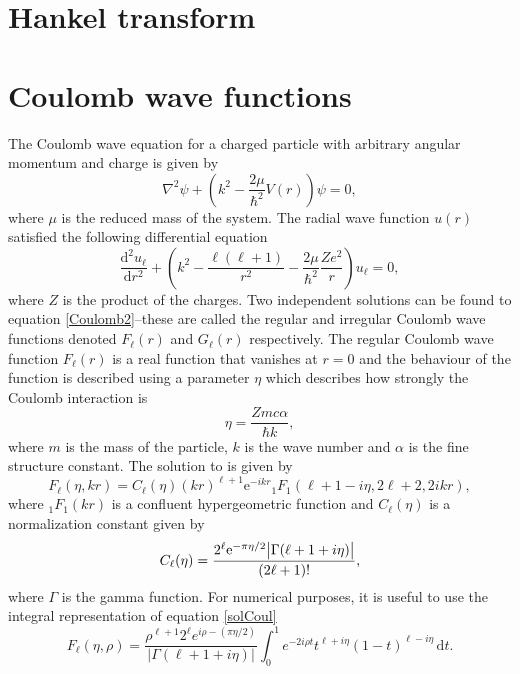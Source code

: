 \section{Hankel transform}
\section{Coulomb wave functions}\label{sec:Coulomb}
The Coulomb wave equation for a charged particle with arbitrary angular momentum and charge is given by 
\begin{equation} \label{Coulomb1}
	\nabla^2\psi +\left( k^2-\frac{2\mu}{\hbar^2}V(r)\right)\psi = 0,
\end{equation}
where $\mu$ is the reduced mass of the system. The radial wave function $u(r)$ satisfied the following differential equation
\begin{equation} \label{Coulomb2}
	\frac{\text{d}^2 u_\ell}{\text{d}r^2}+\left( k^2-\frac{\ell(\ell+1)}{r^2}-\frac{2\mu}{\hbar^2}\frac{Ze^2}{r}\right)u_\ell=0,
\end{equation}
where $Z$ is the product of the charges. Two independent solutions can be found to equation \eqref{Coulomb2}--these are called the regular and irregular Coulomb wave functions denoted $F_\ell(r)$ and $G_\ell(r)$ respectively. The regular Coulomb wave function $F_\ell(r)$ is a real function that vanishes at $r=0$ and the behaviour of the function is described using a parameter $\eta$ which describes how strongly the Coulomb interaction is
\begin{equation} \label{etafactor}
	\eta = \frac{Zmc\alpha }{\hbar k},
\end{equation}
where $m$ is the mass of the particle, $k$ is the wave number and $\alpha$ is the fine structure constant. The solution to is given by
\begin{equation} \label{solCoul}
	F_\ell(\eta,kr) = C_\ell (\eta) (kr)^{\ell+1}\text{e}^{-ikr}  {}_1 F_1(\ell+1-i\eta,2\ell+2,2ikr),
\end{equation}
where ${}_1F_1(kr)$ is a confluent hypergeometric function and $C_\ell(\eta)$ is a normalization constant given by 
\begin{equation} \label{normalization}
	C_\ell(\eta) = \frac{2^\ell \text{e}^{-\pi\eta/2}\abs{\Gamma(\ell+1+i\eta)}}{(2\ell+1)!},
\end{equation}
where $\Gamma$ is the gamma function. For numerical purposes, it is useful to use the integral representation of equation \eqref{solCoul} \cite[eq. 33.7.1]{NIST} 
\begin{equation} \label{integralrep}
	F_\ell(\eta,\rho) = \frac{\rho^{\ell+1}2^\ell e^{i\rho-(\pi\eta/2)}}{|\Gamma(\ell+1+i\eta)|} \int_0^1 e^{-2i\rho t}t^{\ell+i\eta}(1-t)^{\ell-i\eta} \, \text{d}t.
\end{equation}
